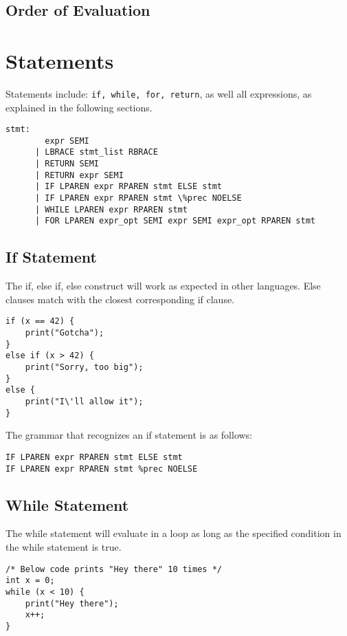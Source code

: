 \documentclass{article}
\begin{document}
\subsection{Order of Evaluation}

\section{Statements}
Statements include: \texttt{if, while, for, return}, as well all expressions, as explained in the following sections. 

\begin{Verbatim}[frame=single]
stmt:
	    expr SEMI 					
	  | LBRACE stmt_list RBRACE				
	  | RETURN SEMI					
	  | RETURN expr SEMI				 
	  | IF LPAREN expr RPAREN stmt ELSE stmt 	     
	  | IF LPAREN expr RPAREN stmt \%prec NOELSE 	     
	  | WHILE LPAREN expr RPAREN stmt 		   
  	  | FOR LPAREN expr_opt SEMI expr SEMI expr_opt RPAREN stmt 

\end{Verbatim}

\subsection{If Statement}
The if, else if, else construct will work as expected in other languages. Else clauses match with the closest corresponding if clause.

\begin{lstlisting}
if (x == 42) {
	print("Gotcha");
}
else if (x > 42) {
	print("Sorry, too big");
}
else {
	print("I\'ll allow it");
}
\end{lstlisting}

The grammar that recognizes an if statement is as follows:
\begin{Verbatim}[frame=single]
IF LPAREN expr RPAREN stmt ELSE stmt
IF LPAREN expr RPAREN stmt %prec NOELSE
\end{Verbatim}

\subsection{While Statement}
The while statement will evaluate in a loop as long as the specified condition in the while statement is true.

\begin{lstlisting}
/* Below code prints "Hey there" 10 times */
int x = 0;
while (x < 10) {
	print("Hey there");
	x++;
}
\end{lstlisting}
\end{document}
